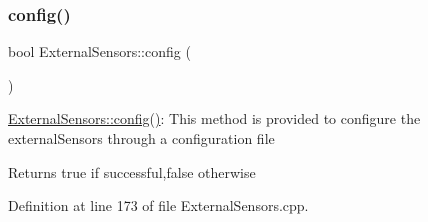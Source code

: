 \subsubsection{\texorpdfstring{config()}{config()}\hspace{0.1cm}{\footnotesize\ttfamily [1/2]}}
{\footnotesize\ttfamily bool External\+Sensors\+::config (\begin{DoxyParamCaption}{ }\end{DoxyParamCaption})}

\hyperlink{class_external_sensors_a862a4bd11346b37270d0244c2adabe5a}{External\+Sensors\+::config()}\+: This method is provided to configure the external\+Sensors through a configuration file

\begin{DoxyReturn}{Returns}
true if successful,false otherwise 
\end{DoxyReturn}


Definition at line 173 of file External\+Sensors.\+cpp.


